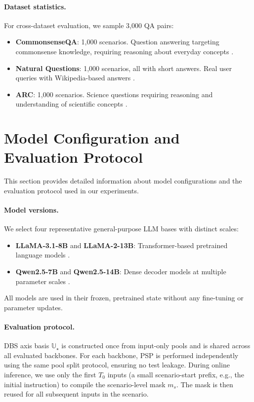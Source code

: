 \paragraph{Dataset statistics.}
For cross-dataset evaluation, we sample 3,000 QA pairs:
\begin{itemize}
    \item \textbf{CommonsenseQA}: 1,000 scenarios. Question answering targeting commonsense knowledge, requiring reasoning about everyday concepts \cite{talmor2019commonsenseqa}.
    \item \textbf{Natural Questions}: 1,000 scenarios, all with short answers. Real user queries with Wikipedia-based answers \cite{kwiatkowski2019natural}.
    \item \textbf{ARC}: 1,000 scenarios. Science questions requiring reasoning and understanding of scientific concepts \cite{clark2018arc}.
\end{itemize}



\section{Model Configuration and Evaluation Protocol}
\label{app:model_protocol}

This section provides detailed information about model configurations and the evaluation protocol used in our experiments.

\paragraph{Model versions.}
We select four representative general-purpose LLM bases with distinct scales:
\begin{itemize}
    \item \textbf{LLaMA-3.1-8B} and \textbf{LLaMA-2-13B}: Transformer-based pretrained language models \cite{touvron2023llama}.
    \item \textbf{Qwen2.5-7B} and \textbf{Qwen2.5-14B}: Dense decoder models at multiple parameter scales \cite{yang2024qwen25}.
\end{itemize}
All models are used in their frozen, pretrained state without any fine-tuning or parameter updates.

\paragraph{Evaluation protocol.}
DBS axis basis $\mathbb{U}_\star$ is constructed once from input-only pools and is shared across all evaluated backbones.
For each backbone, PSP is performed independently using the same pool split protocol, ensuring no test leakage.
During online inference, we use only the first $T_0$ inputs (a small scenario-start prefix, e.g., the initial instruction) to compile the scenario-level mask $m_s$.
The mask is then reused for all subsequent inputs in the scenario.

